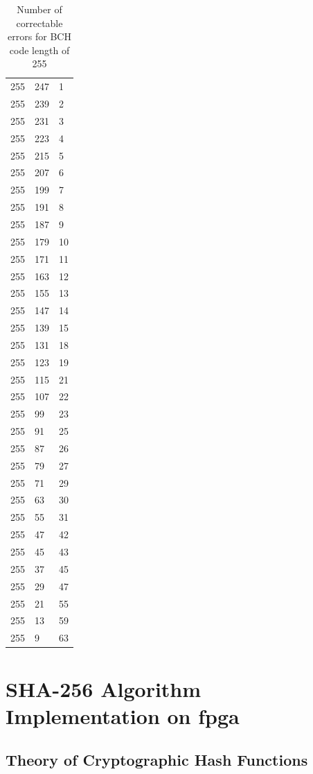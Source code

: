 \begin{table}
\begin{tabular}{lll}
\hline
255 & 247 &   1 \\
255 & 239 &   2 \\
255 & 231 &   3 \\
255 & 223 &   4 \\
255 & 215 &   5 \\
255 & 207 &   6 \\
255 & 199 &   7 \\
255 & 191 &   8 \\
255 & 187 &   9 \\
255 & 179 &  10 \\
255 & 171 &  11 \\
255 & 163 &  12 \\
255 & 155 &  13 \\
255 & 147 &  14 \\
255 & 139 &  15 \\
255 & 131 &  18 \\
255 & 123 &  19 \\
255 & 115 &  21 \\
255 & 107 &  22 \\
255 &  99 &  23 \\
255 &  91 &  25 \\
255 &  87 &  26 \\
255 &  79 &  27 \\
255 &  71 &  29 \\
255 &  63 &  30 \\
255 &  55 &  31 \\
255 &  47 &  42 \\
255 &  45 &  43 \\
255 &  37 &  45 \\
255 &  29 &  47 \\
255 &  21 &  55 \\
255 &  13 &  59 \\
255 &   9 &  63 \\
\end{tabular}
\caption{Number of correctable errors for BCH code length of 255}
\end{table}


\section{SHA-256 Algorithm Implementation on \gls{fpga}}

\subsection{Theory of Cryptographic Hash Functions}

